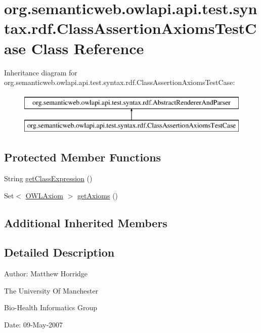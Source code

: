 \hypertarget{classorg_1_1semanticweb_1_1owlapi_1_1api_1_1test_1_1syntax_1_1rdf_1_1_class_assertion_axioms_test_case}{\section{org.\-semanticweb.\-owlapi.\-api.\-test.\-syntax.\-rdf.\-Class\-Assertion\-Axioms\-Test\-Case Class Reference}
\label{classorg_1_1semanticweb_1_1owlapi_1_1api_1_1test_1_1syntax_1_1rdf_1_1_class_assertion_axioms_test_case}
}
Inheritance diagram for org.\-semanticweb.\-owlapi.\-api.\-test.\-syntax.\-rdf.\-Class\-Assertion\-Axioms\-Test\-Case\-:\begin{figure}[H]
\begin{center}
\leavevmode
\includegraphics[height=2.000000cm]{classorg_1_1semanticweb_1_1owlapi_1_1api_1_1test_1_1syntax_1_1rdf_1_1_class_assertion_axioms_test_case}
\end{center}
\end{figure}
\subsection*{Protected Member Functions}
\begin{DoxyCompactItemize}
\item 
String \hyperlink{classorg_1_1semanticweb_1_1owlapi_1_1api_1_1test_1_1syntax_1_1rdf_1_1_class_assertion_axioms_test_case_a97cc7aea17671f84e0908b29183b6e6e}{get\-Class\-Expression} ()
\item 
Set$<$ \hyperlink{interfaceorg_1_1semanticweb_1_1owlapi_1_1model_1_1_o_w_l_axiom}{O\-W\-L\-Axiom} $>$ \hyperlink{classorg_1_1semanticweb_1_1owlapi_1_1api_1_1test_1_1syntax_1_1rdf_1_1_class_assertion_axioms_test_case_aac0be5c7058a783a18273c1a103b3261}{get\-Axioms} ()
\end{DoxyCompactItemize}
\subsection*{Additional Inherited Members}


\subsection{Detailed Description}
Author\-: Matthew Horridge\par
 The University Of Manchester\par
 Bio-\/\-Health Informatics Group\par
 Date\-: 09-\/\-May-\/2007\par
 \par
 


